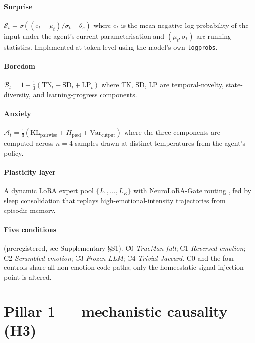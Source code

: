 \documentclass[pdflatex,sn-mathphys-num]{sn-jnl}
\theoremstyle{thmstyleone}
\theoremstyle{thmstylethree}
\begin{document}
\paragraph{Surprise} $\mathcal{S}_t = \sigma\!\left((e_t - \mu_t)/\sigma_t - \theta_s\right)$ where $e_t$ is the mean negative log-probability of the input under the agent's current parameterisation and $(\mu_t, \sigma_t)$ are running statistics. Implemented at token level using the model's own \texttt{logprobs}.

\paragraph{Boredom} $\mathcal{B}_t = 1 - \tfrac{1}{3}(\text{TN}_t + \text{SD}_t + \text{LP}_t)$ where TN, SD, LP are temporal-novelty, state-diversity, and learning-progress components.

\paragraph{Anxiety} $\mathcal{A}_t = \tfrac{1}{3}(\text{KL}_{\text{pairwise}} + H_{\text{pred}} + \text{Var}_{\text{output}})$ where the three components are computed across $n=4$ samples drawn at distinct temperatures from the agent's policy.

\paragraph{Plasticity layer} A dynamic LoRA expert pool $\{L_1,\ldots,L_K\}$ with NeuroLoRA-Gate routing \cite{trueman_v1_arxiv}, fed by sleep consolidation that replays high-emotional-intensity trajectories from episodic memory.

\paragraph{Five conditions} (preregistered, see Supplementary §S1). C0 \emph{TrueMan-full}; C1 \emph{Reversed-emotion}; C2 \emph{Scrambled-emotion}; C3 \emph{Frozen-LLM}; C4 \emph{Trivial-Jaccard}. C0 and the four controls share all non-emotion code paths; only the homeostatic signal injection point is altered.

\section{Pillar 1 --- mechanistic causality (H3)}\label{sec:results_h3}
\end{document}
